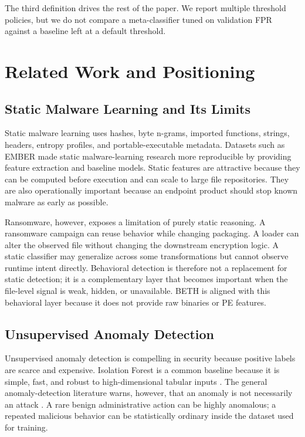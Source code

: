 \documentclass[journal]{IEEEtran}
\begin{document}
The third definition drives the rest of the paper. We report multiple threshold policies, but we do not compare a meta-classifier tuned on validation FPR against a baseline left at a default threshold.

\section{Related Work and Positioning}
\label{sec:related}

\subsection{Static Malware Learning and Its Limits}

Static malware learning uses hashes, byte n-grams, imported functions, strings, headers, entropy profiles, and portable-executable metadata. Datasets such as EMBER \cite{anderson2018} made static malware-learning research more reproducible by providing feature extraction and baseline models. Static features are attractive because they can be computed before execution and can scale to large file repositories. They are also operationally important because an endpoint product should stop known malware as early as possible.

Ransomware, however, exposes a limitation of purely static reasoning. A ransomware campaign can reuse behavior while changing packaging. A loader can alter the observed file without changing the downstream encryption logic. A static classifier may generalize across some transformations but cannot observe runtime intent directly. Behavioral detection is therefore not a replacement for static detection; it is a complementary layer that becomes important when the file-level signal is weak, hidden, or unavailable. BETH is aligned with this behavioral layer because it does not provide raw binaries or PE features.

\subsection{Unsupervised Anomaly Detection}

Unsupervised anomaly detection is compelling in security because positive labels are scarce and expensive. Isolation Forest is a common baseline because it is simple, fast, and robust to high-dimensional tabular inputs \cite{liu2008}. The general anomaly-detection literature warns, however, that an anomaly is not necessarily an attack \cite{chandola2009}. A rare benign administrative action can be highly anomalous; a repeated malicious behavior can be statistically ordinary inside the dataset used for training.
\end{document}
